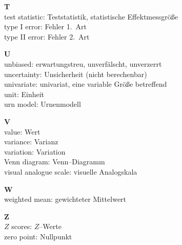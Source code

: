 \medskip
\noindent
{\bf T}\\
test statistic: Teststatistik, statistische
Effektmessgr\"{o}\ss e\\
type I error: Fehler 1.~Art\\
type II error: Fehler 2.~Art

\medskip
\noindent
{\bf U}\\
unbiased: erwartungstreu, unverf\"{a}lscht, unverzerrt\\
uncertainty: Unsicherheit (nicht berechenbar)\\
univariate: univariat, eine variable Gr\"{o}\ss e betreffend\\
unit: Einheit\\
urn model: Urnenmodell

\medskip
\noindent
{\bf V}\\
value: Wert\\
variance: Varianz\\
variation: Variation\\
Venn diagram: Venn--Diagramm\\
visual analogue scale: visuelle Analogskala

\medskip
\noindent
{\bf W}\\
weighted mean: gewichteter Mittelwert

\pagebreak
\medskip
\noindent
{\bf Z}\\
$Z$ scores: $Z$--Werte\\
zero point: Nullpunkt

